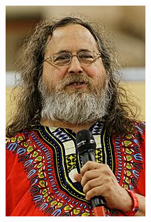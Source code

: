 \begin{multicols}{2}

	\begin{center}
		\includegraphics[height=.8\textheight]{./IMG/rms.jpg}
	\end{center}
		
\end{multicols}
\vfill\null
\pagebreak

